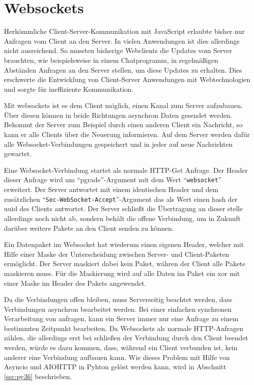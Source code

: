 \documentclass[12pt,a4paper,hidelinks]{scrreprt}
\begin{document}
\section{Websockets}\label{sec:websockets}
	Herkömmliche Client-Server-Kommunikation mit JavaScript erlaubte bisher nur Anfragen vom Client an den Server. 
	In vielen Anwendungen ist dies allerdings nicht ausreichend. So mussten bisherige Webclients die Updates vom Server brauchten, wie beispielsweise in einem Chatprogramm, in regelmäßigen Abständen Anfragen an den Server stellen, um diese Updates zu erhalten. Dies erschwerte die Entwicklung von Client-Server Anwendungen mit Webtechnologien und sorgte für ineffiziente Kommunikation.
	
	Mit \glspl{websocket} ist es dem Client möglich, einen Kanal zum Server aufzubauen. Über diesen können in beide Richtungen asynchron Daten gesendet werden. Bekommt der Server zum Beispiel durch einen anderen Client ein Nachricht, so kann er alle Clients über die Neuerung informieren. Auf dem Server werden dafür alle Websocket-Verbindungen gespeichert und in jeder auf neue Nachrichten gewartet.
	
	Eine Websocket-Verbindung startet als normale HTTP-Get Anfrage. Der Header dieser Anfrage wird um \enquote{pgrade}-Argument mit dem Wert \enquote{\texttt{websocket}} erweitert.
	Der Server antwortet mit einem identischen Header und dem zusätzlichen \enquote{\texttt{Sec-WebSocket-Accept}}-Argument das als Wert einen \gls{hash} der \gls{uuid} des Clients antwortet. Der Server schließt die Übertragung an dieser stelle allerdings noch nicht ab, sondern behält die offene Verbindung, um in Zukunft darüber weitere Pakete an den Client senden zu können.
	
	Ein Datenpaket im Websocket hat wiederum einen eigenen Header, welcher mit Hilfe einer Maske der Unterscheidung zwischen Server- und Client-Paketen ermöglicht. Der Server maskiert dabei kein Paket, währen der Client alle Pakete maskieren muss. Für die Maskierung wird auf alle Daten im Paket ein \gls{xor} mit einer Maske im Header des Pakets angewendet. \cite{rfc6455}
	
	Da die Verbindungen offen bleiben, muss Serverseitig beachtet werden, dass Verbindungen asynchron bearbeitet werden. 
	Bei einer einfachen synchronen Verarbeitung von anfragen, kann ein Server immer nur eine Anfrage zu einem bestimmten Zeitpunkt bearbeiten. Da Websockets als normale HTTP-Anfragen zählen, die allerdings erst bei schließen der Verbindung durch den Client beendet werden, würde es dazu kommen, dass, während ein Client verbunden ist, kein anderer eine Verbindung aufbauen kann. Wie dieses Problem mit Hilfe von Asyncio und AIOHTTP in Pyhton gelöst werden kann, wird in Abschnitt \ref{sec:py36} beschrieben.
	
\end{document}
